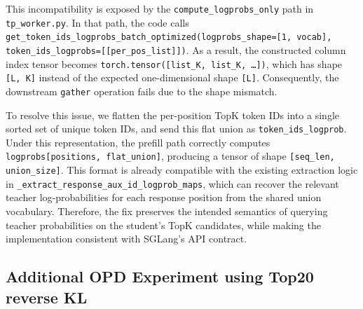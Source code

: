 This incompatibility is exposed by the \texttt{compute\_logprobs\_only} path in \texttt{tp\_worker.py}. In that path, the code calls \texttt{get\_token\_ids\_logprobs\_batch\_optimized(logprobs\_shape=[1, vocab], token\_ids\_logprobs=[[per\_pos\_list]])}. As a result, the constructed column index tensor becomes \texttt{torch.tensor([list\_K, list\_K, \dots])}, which has shape \texttt{[L, K]} instead of the expected one-dimensional shape \texttt{[L]}. Consequently, the downstream \texttt{gather} operation fails due to the shape mismatch.

To resolve this issue, we flatten the per-position TopK token IDs into a single sorted set of unique token IDs, and send this flat union as \texttt{token\_ids\_logprob}. Under this representation, the prefill path correctly computes \texttt{logprobs[positions, flat\_union]}, producing a tensor of shape \texttt{[seq\_len, union\_size]}. This format is already compatible with the existing extraction logic in \texttt{\_extract\_response\_aux\_id\_logprob\_maps}, which can recover the relevant teacher log-probabilities for each response position from the shared union vocabulary. Therefore, the fix preserves the intended semantics of querying teacher probabilities on the student's TopK candidates, while making the implementation consistent with SGLang's API contract.



\subsection{Additional OPD Experiment using Top20 reverse KL}
\label{app:top20reverseKLexp}


